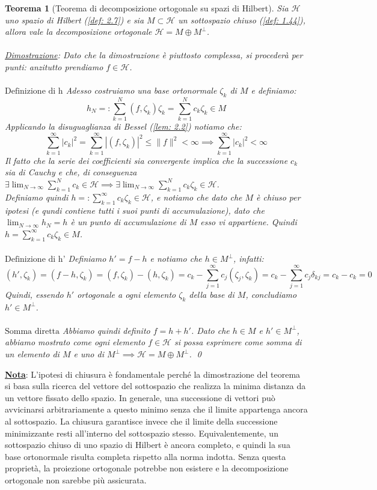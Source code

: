 \documentclass[a4paper,12pt]{report}
\newtheorem{teorema}{Teorema}[chapter]
\newcommand{\lt}{<}
\begin{document}
\begin{teorema}[Teorema di decomposizione ortogonale su spazi di Hilbert]\label{app: A.8}
Sia $\mathscr{H}$ uno spazio di Hilbert (\ref{def: 2.7}) e sia $M\subset \mathscr{H}$ un sottospazio chiuso (\ref{def: 1.44}), allora vale la decomposizione ortogonale $\mathscr{H}=M\oplus M^{\perp}$.
\\
\\\underline{Dimostrazione}: Dato che la dimostrazione è piuttosto complessa, si procederà per punti: anzitutto prendiamo $f\in \mathscr{H}$. 
\\
\\$\boxed{\text{Definizione di h}}$ Adesso costruiamo una base ortonormale $\zeta_k$ di $M$ e definiamo:
\[h_N=:\sum_{k=1}^N (f,\zeta_k)\zeta_k=\sum_{k=1}^N c_k\zeta_k\in M\]
Applicando la disuguaglianza di Bessel (\ref{lem: 2.2}) notiamo che:
\[\displaystyle \sum_{k=1}^\infty|c_k|^2=\sum_{k=1}^\infty |(f,\zeta_k)|^2\leq \|f\|^2\lt \infty\implies \sum_{k=1}^\infty|c_k|^2\lt\infty\]
Il fatto che la serie dei coefficienti sia convergente implica che la successione $c_k$ sia di Cauchy e che, di conseguenza $\displaystyle\exists\lim_{N\to\infty}\sum_{k=1}^N c_k\in \mathscr{H}\implies \exists\lim_{N\to\infty}\sum_{k=1}^Nc_k\zeta_k\in \mathscr{H}$.
\\ Definiamo quindi $h=:\displaystyle\sum_{k=1}^\infty c_k\zeta_k\in \mathscr{H}$, e notiamo che dato che $M$ è chiuso per ipotesi (e qundi contiene tutti i suoi punti di accumulazione), dato che $\lim_{N\to\infty}h_N=h$ è un punto di accumulazione di $M$ esso vi appartiene. Quindi $h=\sum_{k=1}^\infty c_k\zeta_k \in M$.
\\
\\ $\boxed{\text{Definizione di h'}}$ Definiamo $h'=f-h$ e notiamo che $h\in M^{\perp}$, infatti:
\[(h', \zeta_k)=(f-h,\zeta_k)=(f,\zeta_k)-(h,\zeta_k)=c_k-\sum_{j=1}^\infty c_j(\zeta_j,\zeta_k)=c_k-\sum_{j=1}^\infty c_j\delta_{kj}=c_k-c_k=0\]
Quindi, essendo $h'$ ortogonale a ogni elemento $\zeta_k$ della base di $M$, concludiamo $h'\in M^{\perp}$.
\\
\\$\boxed{\text{Somma diretta}}$ Abbiamo quindi definito $f=h+h'$. Dato che $h\in M$ e $h'\in M^{\perp}$, abbiamo mostrato come ogni elemento $f\in \mathscr{H}$ si possa esprimere come somma di un elemento di $M$ e uno di $M^{\perp}\implies \mathscr{H}=M\oplus M^{\perp}$. \qed
\end{teorema}

\underline{\textbf{Nota}}: L’ipotesi di chiusura è fondamentale perché la dimostrazione del teorema si basa sulla ricerca del vettore del sottospazio che realizza la minima distanza da un vettore fissato dello spazio. In generale, una successione di vettori può avvicinarsi arbitrariamente a questo minimo senza che il limite appartenga ancora al sottospazio. La chiusura garantisce invece che il limite della successione minimizzante resti all’interno del sottospazio stesso. Equivalentemente, un sottospazio chiuso di uno spazio di Hilbert è ancora completo, e quindi la sua base ortonormale risulta completa rispetto alla norma indotta. Senza questa proprietà, la proiezione ortogonale potrebbe non esistere e la decomposizione ortogonale non sarebbe più assicurata.
\end{document}
